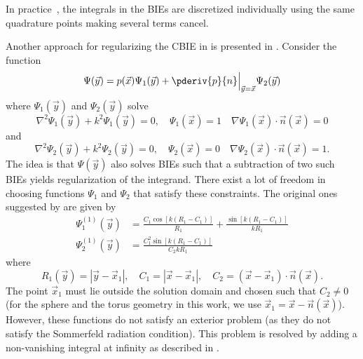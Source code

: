 In practice~\cite{Scott2013ibe}, the integrals in the BIEs are discretized individually using the same quadrature points making several terms cancel.

Another approach for regularizing the CBIE in  is presented in \cite{Sun2015bri}. Consider the function
\begin{equation*}
	\Psi(\vec{y}) = p(\vec{x})\Psi_1(\vec{y}) + \pderiv{p}{n}\Big\vert_{\vec{y}=\vec{x}}\Psi_2(\vec{y})
\end{equation*}
where $\Psi_1(\vec{y})$ and $\Psi_2(\vec{y})$ solve
\begin{equation*}
	\nabla^2\Psi_1(\vec{y}) + k^2\Psi_1(\vec{y}) = 0,\quad \Psi_1(\vec{x})= 1\quad \nabla\Psi_1(\vec{x})\cdot \vec{n}(\vec{x}) = 0
\end{equation*}
and
\begin{equation*}
	\nabla^2\Psi_2(\vec{y}) + k^2\Psi_2(\vec{y}) = 0,\quad \Psi_2(\vec{x})= 0\quad \nabla\Psi_2(\vec{x})\cdot \vec{n}(\vec{x}) = 1.
\end{equation*}
The idea is that $\Psi(\vec{y})$ also solves BIEs such that a subtraction of two such BIEs yields regularization of the integrand. There exist a lot of freedom in choosing functions $\Psi_1$ and $\Psi_2$ that satisfy these constraints. The original ones suggested by \cite{Sun2015bri} are given by
\begin{equation}\label{Eq3:psi_12_1}
\begin{aligned}
	\Psi_1^{(1)}(\vec{y}) &= \frac{C_1\cos[k(R_1-C_1)]}{R_1} + \frac{\sin[k(R_1-C_1)]}{kR_1}\\
	\Psi_2^{(1)}(\vec{y}) &= \frac{C_1^2\sin[k(R_1-C_1)]}{C_2kR_1}
\end{aligned}
\end{equation}
where
\begin{equation*}
	R_1(\vec{y}) = |\vec{y}-\vec{x}_1|, \quad C_1 = |\vec{x}-\vec{x}_1|,\quad C_2 = (\vec{x}-\vec{x}_1)\cdot\vec{n}(\vec{x}).
\end{equation*}
The point $\vec{x}_1$ must lie outside the solution domain and chosen such that $C_2\neq 0$ (for the sphere and the torus geometry in this work, we use $\vec{x}_1=\vec{x} - \vec{n}(\vec{x})$). However, these functions do not satisfy an exterior problem (as they do not satisfy the Sommerfeld radiation condition). This problem is resolved by adding a non-vanishing integral at infinity as described in \cite{Sun2015bri}.

